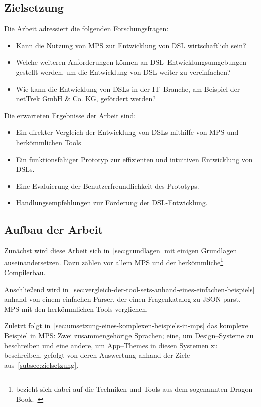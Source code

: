 \subsection{Zielsetzung}\label{subsec:zielsetzung}
Die Arbeit adressiert die folgenden Forschungsfragen:
\begin{itemize}
    \item Kann die Nutzung von \ac{MPS} zur Entwicklung von \ac{DSL} wirtschaftlich sein?
    \item Welche weiteren Anforderungen können an \ac{DSL}--Entwicklungsumgebungen gestellt werden, um die Entwicklung von \ac{DSL} weiter zu vereinfachen?
    \item Wie kann die Entwicklung von \acp{DSL} in der \acs{IT}--Branche, am Beispiel der netTrek GmbH \& Co. KG, gefördert werden?
\end{itemize}
Die erwarteten Ergebnisse der Arbeit sind:
\begin{itemize}
    \item Ein direkter Vergleich der Entwicklung von \acp{DSL} mithilfe von \ac{MPS} und herkömmlichen Tools
    \item Ein funktionsfähiger Prototyp zur effizienten und intuitiven Entwicklung von DSLs.
    \item Eine Evaluierung der Benutzerfreundlichkeit des Prototyps.
    \item Handlungsempfehlungen zur Förderung der DSL-Entwicklung.
\end{itemize}

\subsection{Aufbau der Arbeit}\label{subsec:aufbau-der-arbeit}
Zunächst wird diese Arbeit sich in~\autoref{sec:grundlagen} mit einigen Grundlagen auseinandersetzen.
Dazu zählen vor allem \ac{MPS} und der herkömmliche\footnote{ bezieht sich dabei auf die Techniken und Tools aus dem sogenannten Dragon--Book.~\autocite{aho-2006}} Compilerbau.

Anschließend wird in~\autoref{sec:vergleich-der-tool-sets-anhand-eines-einfachen-beispiels} anhand von einem einfachen Parser, der einen Fragenkatalog zu \ac{JSON} parst, \ac{MPS} mit den herkömmlichen Tools verglichen.

Zuletzt folgt in~\autoref{sec:umsetzung-eines-komplexen-beispiels-in-mps} das komplexe Beispiel in \ac{MPS}: Zwei zusammengehörige Sprachen; eine, um Design--Systeme zu beschreiben und eine andere, um App--Themes in diesen Systemen zu beschreiben, gefolgt von deren Auswertung anhand der Ziele aus~\autoref{subsec:zielsetzung}.
